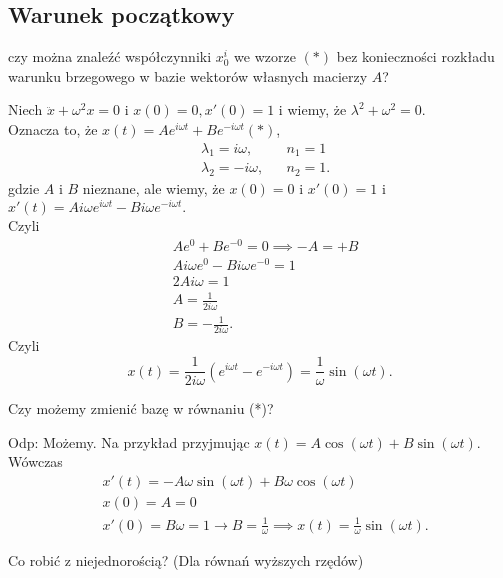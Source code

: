 \documentclass[../main.tex]{subfiles}
\begin{document}
        \subsection{Warunek początkowy}
        czy można znaleźć współczynniki $x_0^i$ we wzorze $(*)$ bez konieczności rozkładu warunku brzegowego w bazie wektorów własnych macierzy $A$?
        \begin{przyklad}
            Niech $\ddot{x} + \omega^2 x = 0$ i $x(0) = 0, x'(0) = 1$ i wiemy, że $\lambda^2 + \omega^2 = 0$.\\
            Oznacza to, że $x(t) = A e^{i\omega t} + B e^{-i\omega t}(*)$,
            \begin{align*}
                &\lambda_1 = i\omega, &&n_1 = 1\\
                &\lambda_2 = -i\omega, &&n_2 = 1
            .\end{align*}
            gdzie $A$ i $B$ nieznane, ale wiemy, że $x(0) = 0$ i $x'(0) = 1$ i $x'(t) = Ai\omega e^{i\omega t} - Bi\omega e^{-i\omega t}.$\\
            Czyli
            \begin{align*}
            &Ae^{0}+Be^{-0}= 0 \implies -A = +B\\
            &Ai\omega e^{0}- Bi\omega e^{-0} = 1\\
            &2Ai\omega = 1\\
            &A = \frac{1}{2i\omega}\\
            &B = -\frac{1}{2i\omega}
            .\end{align*}
            Czyli
            \[
                x(t) = \frac{1}{2i\omega}\left( e^{i\omega t}- e^{-i\omega t} \right) = \frac{1}{\omega}\sin(\omega t)
            .\]
        \end{przyklad}
        \begin{pytanie}
            Czy możemy zmienić bazę w równaniu (*)?
        \end{pytanie}
        Odp: Możemy. Na przykład przyjmując $x(t) = A \cos(\omega t) + B \sin(\omega t)$. Wówczas
        \begin{align*}
            &x'(t) = -A\omega \sin(\omega t) + B \omega \cos(\omega t)\\
            &x(0) = A = 0\\
            &x'(0) = B\omega = 1 \to B = \frac{1}{\omega} \implies x(t) = \frac{1}{\omega}\sin(\omega t)
        .\end{align*}
        \begin{pytanie}
            Co robić z niejednorością? (Dla równań wyższych rzędów)
        \end{pytanie}
\end{document}
